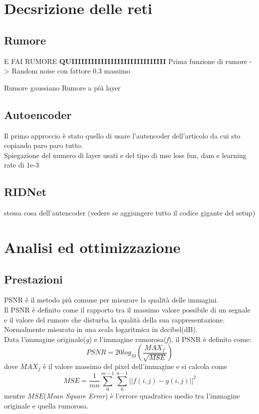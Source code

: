 \documentclass[12pt,a4paper,openright,twoside]{book}
\newcommand{\TODOComment}[1]{}
\begin{document}
\chapter{Decsrizione delle reti}
\section{Rumore}
E FAI RUMORE \textbf{QUIIIIIIIIIIIIIIIIIIIIIIIIIIIII}
Prima funzione di rumore -> Random noise con fattore 0.3 massimo
\TODOComment{questi 2 più avanti}
Rumore gaussiano 
Rumore a più layer


\section{Autoencoder}
Il primo approccio è stato quello di usare l'autencoder dell'articolo da cui sto copiando paro paro tutto.\\
Spiegazione del numero di layer usati e del tipo di mse loss fun, dam e learning rate di 1e-3

\TODOComment{Modificare il dataset per i cosi successivi}

\section{RIDNet}
stessa cosa dell'autencoder (vedere se aggiungere tutto il codice gigante del setup)


\chapter{Analisi ed ottimizzazione}
\section{Prestazioni}
PSNR è il metodo più comune per misurare la qualità delle immagini.\\
Il PSNR è definito come il rapporto tra il massimo valore possibile di un segnale e il valore del rumore che disturba la qualità della sua rappresentazione.\\ Normalmente misurato in una scala logaritmica in decibel(dB).\\
Data l'immagine originale(\textit{g}) e l'immagine rumorosa(\textit{f}), il PSNR è definito come: \[PSNR=20log_{10}(\frac{MAX_f}{\sqrt{MSE}})\] dove $MAX_f$ è il valore massimo del pixel dell'immagine e si calcola come \[MSE=\frac{1}{mn}\sum_{0}^{m-1}\sum_{0}^{n-1}||f(i,j)-g(i,j)||^2  \] mentre $MSE$(\textit{Mean Square Error}) è l'errore quadratico medio tra l'immagine originale e quella rumorosa.\\
\TODOComment{Aggiungere codice del pnrr}
\end{document}
